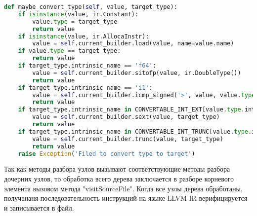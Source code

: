 \begin{lstlisting}[language=Python,caption={Вспомогательный метод согласования типов},label={lst:helpers}]
def maybe_convert_type(self, value, target_type):
    if isinstance(value, ir.Constant):
        value.type = target_type
        return value
    if isinstance(value, ir.AllocaInstr):
        value = self.current_builder.load(value, name=value.name)
    if value.type == target_type:
        return value
    if target_type.intrinsic_name == 'f64':
        value = self.current_builder.sitofp(value, ir.DoubleType())
        return value
    if target_type.intrinsic_name == 'i1':
        value = self.current_builder.icmp_signed('>', value, value.type(0))
        return value
    if target_type.intrinsic_name in CONVERTABLE_INT_EXT[value.type.intrinsic_name]:
        value = self.current_builder.sext(value, target_type)
        return value
    if target_type.intrinsic_name in CONVERTABLE_INT_TRUNC[value.type.intrinsic_name]:
        value = self.current_builder.trunc(value, target_type)
        return value
    raise Exception('Filed to convert type to target')
\end{lstlisting}

Так как методы разбора узлов вызывают соответствующие методы разбора дочерних узлов, то обработка всего дерева
заключается в разборе корневого элемента вызовом метода "visitSourceFile".
Когда все узлы дерева обработаны, полученаня последовательность инструкций на языке LLVM IR верифицируется и записывается
в файл.
